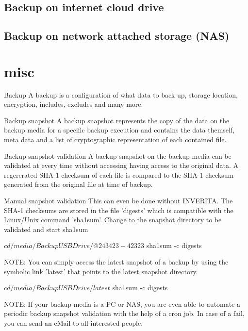 \subsection{Backup on internet cloud drive}

\subsection{Backup on network attached storage (NAS)}


\section{misc}

Backup
A backup is a configuration of what data to back up, storage location,
encryption, includes, excludes and many more.

Backup snapshot
A backup snapshot represents the copy of the data on the backup media
for a specific backup execution and contains the data themself, meta data
and a list of cryptographic representation of each contained file.

Backup snapshot validation
A backup snapshot on the backup media can be validated at every time
without accessing having access to the original data. A regererated SHA-1
checksum of each file is compared to the SHA-1 checksum generated from the
original file at time of backup.

Manual snapshot validation
This can even be done without INVERITA. The SHA-1 checksums are stored
in the file 'digests' which is compatible with the Linux/Unix command 'sha1sum'.
Change to the snapshot directory to be validated and start sha1sum

\begin{console}
$ cd /media/BackupUSBDrive/@243423-42323
$ sha1sum -c digests
\end{console}

NOTE: You can simply access the latest snapshot of a backup by using the
      symbolic link 'latest' that points to the latest snapshot directory.

      $ cd /media/BackupUSBDrive/latest
      $ sha1sum -c digests

NOTE: If your backup media is a PC or NAS, you are even able to automate a periodic
      backup snapshot validation with the help of a cron job. In case of a fail,
      you can send an eMail to all interested people.

